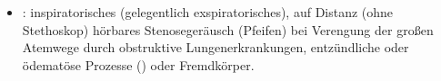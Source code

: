 {\begin{itemize}
  \begin{itemize}
    \item {} (eher Knistern)
    \item {} (Blubbern)
  \end{itemize}
  \item {}: inspiratorisches
  (gelegentlich exspiratorisches), auf Distanz (ohne Stethoskop)
  hörbares Stenosegeräusch (Pfeifen) bei Verengung der großen
  Atemwege durch obstruktive Lungenerkrankungen, entzündliche oder
  ödematöse Prozesse () oder Fremdkörper.
\end{itemize}
}{
\begin{PkuBefunde}[]
  \item[\SymbolPkuNormal] 
  \item[\SymbolPkuPathologisch] 
\end{PkuBefunde}
}{}{}{}

